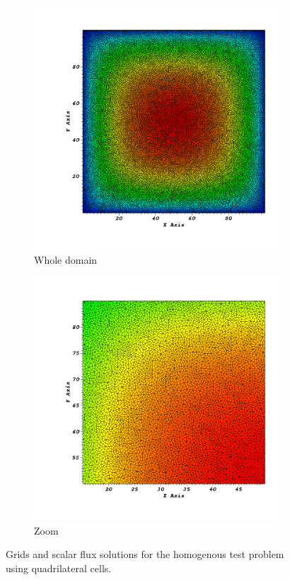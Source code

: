 \documentclass[preprint,10pt]{elsarticle}
\renewcommand{\(}{\left(}
\renewcommand{\)}{\right)}
\renewcommand{\[}{\left[}
\renewcommand{\]}{\right]}
\begin{document}
\begin{figure}[!htbp]
  \centering
  \begin{subfigure}{0.45\textwidth}
    \centering
    \includegraphics[width=\textwidth]{quad_solu0000}
    \caption{Whole domain}
  \end{subfigure}
  \begin{subfigure}{0.45\textwidth}
    \centering
    \includegraphics[width=\textwidth]{quad_solu0001}
    \caption{Zoom}
  \end{subfigure}
  \caption{Grids and scalar flux solutions for the homogenous test problem using quadrilateral cells.}
  \label{homog_test_quads}
\end{figure}
\end{document}
